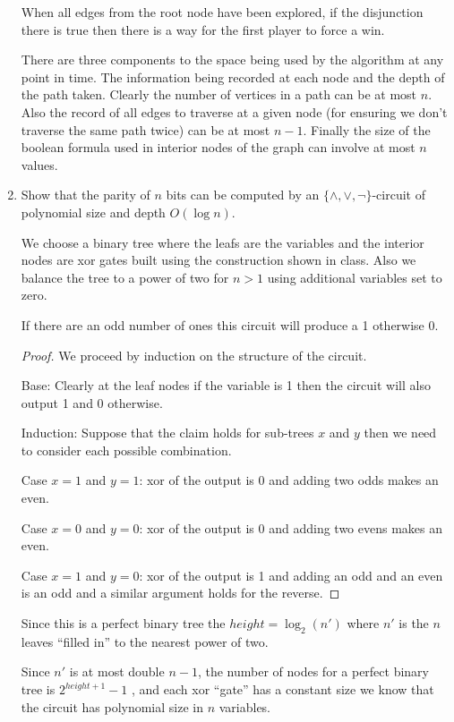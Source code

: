 \documentclass[usletter]{article}
\begin{document}
\begin{enumerate}
   When all edges from the root node have been explored, if the disjunction there is true then there is a way for the first player to force a win.

   There are three components to the space being used by the algorithm at any point in time. The information being recorded at each node and the depth of the path taken. Clearly the number of vertices in a path can be at most $n$. Also the record of all edges to traverse at a given node (for ensuring we don't traverse the same path twice) can be at most $n-1$. Finally the size of the boolean formula used in interior nodes of the graph can involve at most $n$ values.

 \item Show that the parity of $n$ bits can be computed by an $\{\land, \lor, \neg \}$-circuit of polynomial size and depth $O(\log n)$.

   We choose a binary tree where the leafs are the variables and the interior nodes are xor gates built using the construction shown in class. Also we balance the tree to a power of two for $n > 1$ using additional variables set to zero.

   \begin{claim}
     If there are an odd number of ones this circuit will produce a 1 otherwise 0.
   \end{claim}

   \begin{proof}
     We proceed by induction on the structure of the circuit.

     Base: Clearly at the leaf nodes if the variable is 1 then the circuit will also output 1 and 0 otherwise.

     Induction: Suppose that the claim holds for sub-trees $x$ and $y$ then we need to consider each possible combination.

     Case $x = 1$ and $y = 1$: xor of the output is 0 and adding two odds makes an even.

     Case $x = 0$ and $y = 0$: xor of the output is 0 and adding two evens makes an even.

     Case $x = 1$ and $y = 0$: xor of the output is 1 and adding an odd and an even is an odd and a similar argument holds for the reverse.
   \end{proof}

   Since this is a perfect binary tree the $height = \log_2 (n')$ where $n'$ is the $n$ leaves ``filled in'' to the nearest power of two.

   Since $n'$ is at most double $n-1$, the number of nodes for a perfect binary tree is $2^{height+1}-1$ \cite{wikipedia}, and each xor ``gate'' has a constant size we know that the circuit has polynomial size in $n$ variables.


\end{enumerate}
\end{document}
